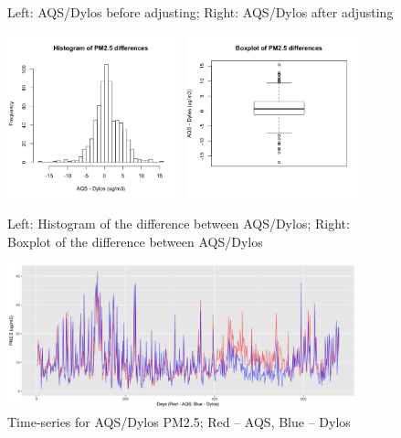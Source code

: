 \documentclass{article}
\begin{document}
\begin{itemize}
{\begin{figure}[H]
            \caption{Left: AQS/Dylos before adjusting; Right: AQS/Dylos after adjusting}
            \label{fig:scatters}
        \end{figure}
        \begin{figure}[H]
            \centering
            \includegraphics[width=0.45\textwidth]{img/aqs_dylos/hist.png} \qquad
            \includegraphics[width=0.45\textwidth]{img/aqs_dylos/boxplot.png}
            \caption{Left: Histogram of the difference between AQS/Dylos; Right: Boxplot of the difference between AQS/Dylos}
            \label{fig:histbox}
        \end{figure}
        \begin{figure}[H]
            \centering
            \includegraphics[width=0.9\textwidth]{img/aqs_dylos/time_series.jpg}
            \caption{Time-series for AQS/Dylos PM2.5; Red -- AQS, Blue -- Dylos}
            \label{fig:time}
        \end{figure}
    }
    
\end{itemize}
\end{document}
